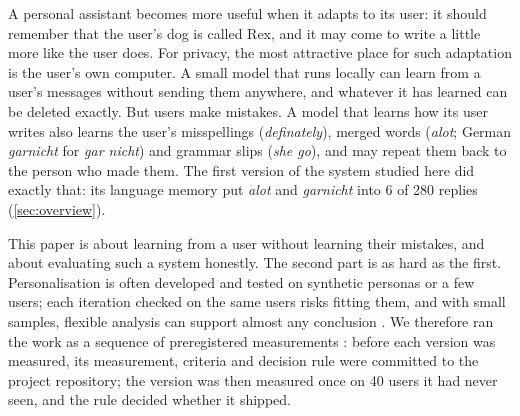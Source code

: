 \documentclass[10pt,twocolumn]{article}
\begin{document}
A personal assistant becomes more useful when it adapts to its user: it should remember that the user's dog is called
Rex, and it may come to write a little more like the user does. For privacy, the most attractive place for such
adaptation is the user's own computer. A small model that runs locally can learn from a user's messages without sending
them anywhere, and whatever it has learned can be deleted exactly. But users make mistakes. A model that learns how its
user writes also learns the user's misspellings (\emph{definately}), merged words (\emph{alot}; German \emph{garnicht}
for \emph{gar nicht}) and grammar slips (\emph{she go}), and may repeat them back to the person who made them. The first
version of the system studied here did exactly that: its language memory put \emph{alot} and \emph{garnicht} into 6 of
280 replies (\cref{sec:overview}).

This paper is about learning from a user without learning their mistakes, and about evaluating such a system honestly.
The second part is as hard as the first. Personalisation is often developed and tested on synthetic personas or a few
users; each iteration checked on the same users risks fitting them, and with small samples, flexible analysis can
support almost any conclusion \citep{simmons2011false,gelman2014crisis}. We therefore ran the work as a sequence of
preregistered measurements \citep{nosek2018prereg,olken2015pap}: before each version was measured, its measurement,
criteria and decision rule were committed to the project repository; the version was then measured once on 40 users it
had never seen, and the rule decided whether it shipped.
\end{document}
